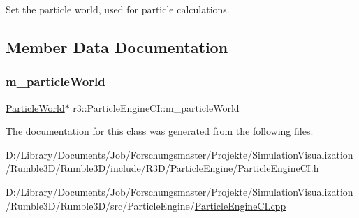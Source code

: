 Set the particle world, used for particle calculations. 

\subsection{Member Data Documentation}
\mbox{\label{classr3_1_1_particle_engine_c_i_ad13321df475d526a7a2ed34e46cc10ee}} 
\subsubsection{\texorpdfstring{m\+\_\+particle\+World}{m\_particleWorld}}
{\footnotesize\ttfamily \mbox{\hyperlink{classr3_1_1_particle_world}{Particle\+World}}$\ast$ r3\+::\+Particle\+Engine\+C\+I\+::m\+\_\+particle\+World\hspace{0.3cm}{\ttfamily [protected]}}



The documentation for this class was generated from the following files\+:\begin{DoxyCompactItemize}
\item 
D\+:/\+Library/\+Documents/\+Job/\+Forschungsmaster/\+Projekte/\+Simulation\+Visualization/\+Rumble3\+D/\+Rumble3\+D/include/\+R3\+D/\+Particle\+Engine/\mbox{\hyperlink{_particle_engine_c_i_8h}{Particle\+Engine\+C\+I.\+h}}\item 
D\+:/\+Library/\+Documents/\+Job/\+Forschungsmaster/\+Projekte/\+Simulation\+Visualization/\+Rumble3\+D/\+Rumble3\+D/src/\+Particle\+Engine/\mbox{\hyperlink{_particle_engine_c_i_8cpp}{Particle\+Engine\+C\+I.\+cpp}}\end{DoxyCompactItemize}
